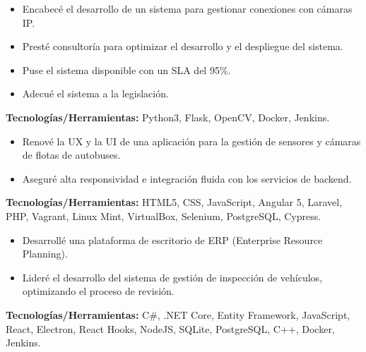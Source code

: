\documentclass[10pt,a4paper]{altacv}
\begin{document}
\vspace{5mm}

\begin{itemize}
    \setlength{\itemindent}{0.5em}
    \item[--] Encabecé el desarrollo de un sistema para gestionar conexiones con cámaras IP.
    \item[--] Presté consultoría para optimizar el desarrollo y el despliegue del sistema.
    \item[--] Puse el sistema disponible con un SLA del 95\%.
    \item[--] Adecué el sistema a la legislación.
\end{itemize}
\textbf{Tecnologías/Herramientas:} Python3, Flask, OpenCV, Docker, Jenkins.
\vspace{5mm}

\begin{itemize}
    \setlength{\itemindent}{0.5em}
    \item[--] Renové la UX y la UI de una aplicación para la gestión de sensores y cámaras de flotas de autobuses.
    \item[--] Aseguré alta responsividad e integración fluida con los servicios de backend.
\end{itemize}
\textbf{Tecnologías/Herramientas:} HTML5, CSS, JavaScript, Angular 5, Laravel, PHP, Vagrant, Linux Mint, VirtualBox, Selenium, PostgreSQL, Cypress.
\vspace{5mm}

\begin{itemize}
    \setlength{\itemindent}{0.5em}
    \item[--] Desarrollé una plataforma de escritorio de ERP (Enterprise Resource Planning).
    \item[--] Lideré el desarrollo del sistema de gestión de inspección de vehículos, optimizando el proceso de revisión.
\end{itemize}
\textbf{Tecnologías/Herramientas:} C\#, .NET Core, Entity Framework, JavaScript, React, Electron, React Hooks, NodeJS, SQLite, PostgreSQL, C++, Docker, Jenkins.
\vspace{5mm}
\end{document}
